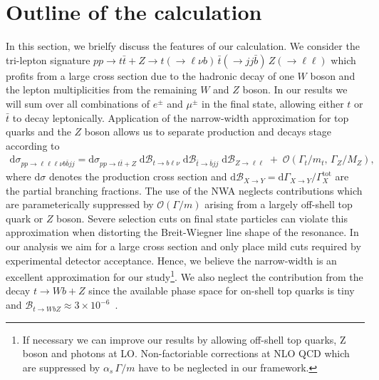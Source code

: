\documentclass[preprint]{JHEP3} %
\newcommand{\mrm}{\mathrm}
\newcommand{\rd}{\mathrm{d}}
\newcommand{\Br}{\mathcal{B}}
\def\ttb{t\bar{t}}
\newcommand{\be}{\begin{eqnarray}}
\newcommand{\ee}{\end{eqnarray}}
\begin{document}
\section{Outline of the calculation}
In this section, we brielfy discuss the features of our calculation.
We consider the tri-lepton signature  
$pp \to \ttb + Z \to t(\to \ell \nu b) \, \bar{t} (\to jj \bar{b}) \, Z(\to \ell \ell)$
which profits from a large cross section due to the hadronic decay of one $W$ boson and the lepton multiplicities from the remaining $W$ and $Z$ boson.
In our results we will sum over all combinations of $e^\pm$ and $\mu^\pm$ in the final state, allowing either $t$ or $\bar t$ to decay leptonically.
Application of the narrow-width approximation for top quarks and the $Z$ boson allows us to separate production and decays stage according to 
\be
 \rd \sigma_{pp\to\ell\ell\ell\nu b \bar{b} jj} = \rd \sigma_{pp\to\ttb+Z} \; \rd\Br_{t\to b \ell\nu} \; \rd\Br_{\bar{t} \to \bar{b} jj} \; \rd\Br_{Z\to \ell\ell}
 \;+\; \mathcal{O}(\Gamma_t/m_t, \, \Gamma_Z/M_Z)
, \label{Xsec}
\ee
where $\rd \sigma$ denotes the production cross section and $\rd\Br_{X\to Y}= \rd \Gamma_{X\to Y} \big/ \Gamma^\mrm{tot}_X$ are the partial branching fractions.
The use of the NWA neglects contributions which are parameterically suppressed by $\mathcal{O}(\Gamma / m)$ arising from a largely off-shell top quark or $Z$ boson.
Severe selection cuts on final state particles can violate this approximation when distorting the Breit-Wiegner line shape of the resonance.
In our analysis we aim for a large cross section and only place mild cuts required by experimental detector acceptance. 
Hence, we believe the narrow-width is an excellent approximation for our study\footnote{
If necessary we can improve our results by allowing off-shell top quarks, Z boson and photons at LO.
Non-factoriable corrections at NLO QCD which are suppressed by $\alpha_s \, \Gamma/m$ have to be neglected in our framework.
}.
We also neglect the contribution from the decay $t \to Wb+Z$ since the available phase space for on-shell top quarks is tiny and 
$\Br_{t\to W bZ } \approx 3 \times 10^{-6}$~\cite{Baur:2004uw}.
\end{document}
